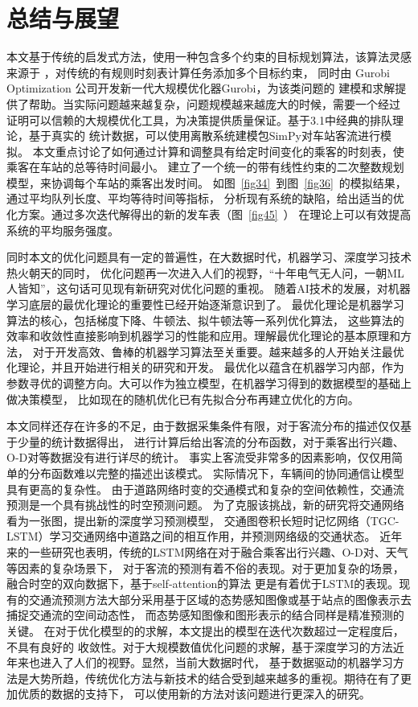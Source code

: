 \section{总结与展望}
本文基于传统的启发式方法，使用一种包含多个约束的目标规划算法，该算法灵感来源于
\cite{CHIERICI200499,2002}，对传统的有规则时刻表计算任务添加多个目标约束，
同时由 Gurobi Optimization 公司开发新一代大规模优化器Gurobi，为该类问题的
建模和求解提供了帮助。当实际问题越来越复杂，问题规模越来越庞大的时候，需要一个经过
证明可以信赖的大规模优化工具，为决策提供质量保证。基于3.1中经典的排队理论，基于真实的
统计数据，可以使用离散系统建模包SimPy对车站客流进行模拟。
本文重点讨论了如何通过计算和调整具有给定时间变化的乘客的时刻表，使乘客在车站的总等待时间最小。
建立了一个统一的带有线性约束的二次整数规划模型，来协调每个车站的乘客出发时间。
如图~\ref{fig34}~到图~\ref{fig36}~的模拟结果，通过平均队列长度、平均等待时间等指标，
分析现有系统的缺陷，给出适当的优化方案。通过多次迭代解得出的新的发车表（图~\ref{fig45}~）
在理论上可以有效提高系统的平均服务强度。

同时本文的优化问题具有一定的普遍性，在大数据时代，机器学习、深度学习技术热火朝天的同时，
优化问题再一次进入人们的视野，“十年电气无人问，一朝ML人皆知”，这句话可见现有新研究对优化问题的重视。
随着AI技术的发展，对机器学习底层的最优化理论的重要性已经开始逐渐意识到了。
最优化理论是机器学习算法的核心，包括梯度下降、牛顿法、拟牛顿法等一系列优化算法，
这些算法的效率和收敛性直接影响到机器学习的性能和应用。理解最优化理论的基本原理和方法，
对于开发高效、鲁棒的机器学习算法至关重要。越来越多的人开始关注最优化理论，并且开始进行相关的研究和开发。
最优化以蕴含在机器学习内部，作为参数寻优的调整方向。大可以作为独立模型，在机器学习得到的数据模型的基础上做决策模型，
比如现在的随机优化已有先拟合分布再建立优化的方向。

本文同样还存在许多的不足，由于数据采集条件有限，对于客流分布的描述仅仅基于少量的统计数据得出，
进行计算后给出客流的分布函数，对于乘客出行兴趣、O-D对等数据没有进行详尽的统计。
事实上客流受非常多的因素影响，仅仅用简单的分布函数难以完整的描述出该模式。
实际情况下，车辆间的协同通信让模型具有更高的复杂性。
由于道路网络时变的交通模式和复杂的空间依赖性，交通流预测是一个具有挑战性的时空预测问题。
为了克服该挑战，新的研究将交通网络看为一张图，提出新的深度学习预测模型，
交通图卷积长短时记忆网络（TGC-LSTM）学习交通网络中道路之间的相互作用，并预测网络级的交通状态。
近年来的一些研究\cite{bjtu2020}也表明，传统的LSTM网络在对于融合乘客出行兴趣、O-D对、天气等因素的复杂场景下，
对于客流的预测有着不俗的表现。对于更加复杂的场景，融合时空的双向数据下，基于self-attention的算法\cite{transformer2022}
更是有着优于LSTM的表现。现有的交通流预测方法大部分采用基于区域的态势感知图像或基于站点的图像表示去捕捉交通流的空间动态性，
而态势感知图像和图形表示的结合同样是精准预测的关键。
在对于优化模型的的求解，本文提出的模型在迭代次数超过一定程度后，不具有良好的
收敛性。对于大规模数值优化问题的求解，基于深度学习的方法\cite{nair2021solving}近年来也进入了人们的视野。显然，当前大数据时代，
基于数据驱动的机器学习方法是大势所趋，传统优化方法与新技术的结合受到越来越多的重视。期待在有了更加优质的数据的支持下，
可以使用新的方法对该问题进行更深入的研究。



